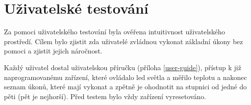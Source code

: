 

\section{Uživatelské testování}
Za pomoci uživatelského testování byla ověřena intuitivnost uživatelského prostředí. Cílem bylo zjistit zda uživatelé zvládnou vykonat základní úkony bez pomoci a zjistit jejich náročnost.

Každý uživatel dostal uživatelskou příručku (příloha \ref{user-guide}), přístup k již naprogramovanému zařízení, které ovládalo led světla a měřilo teplotu a nakonec seznam úkonů, které mají vykonat a zpětně je ohodnotit na stupnici od jedné do pěti (pět je nejhorší). Před testem bylo vždy zařízení vyresetováno.


